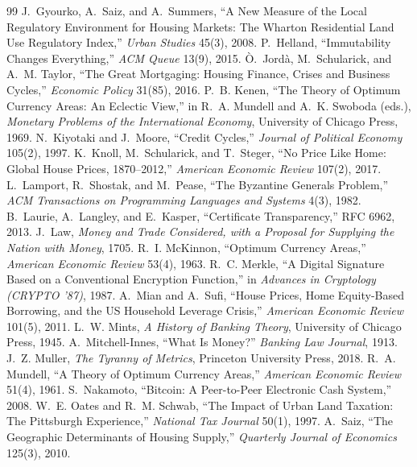 \documentclass[11pt]{article}
\theoremstyle{definition}
\begin{document}
\begin{thebibliography}{99}
 J.~Gyourko, A.~Saiz, and A.~Summers, ``A New Measure of the Local Regulatory Environment for Housing Markets: The Wharton Residential Land Use Regulatory Index,'' \emph{Urban Studies} 45(3), 2008.
 P.~Helland, ``Immutability Changes Everything,'' \emph{ACM Queue} 13(9), 2015.
 \`O.~Jord\`a, M.~Schularick, and A.~M. Taylor, ``The Great Mortgaging: Housing Finance, Crises and Business Cycles,'' \emph{Economic Policy} 31(85), 2016.
 P.~B. Kenen, ``The Theory of Optimum Currency Areas: An Eclectic View,'' in R.~A. Mundell and A.~K. Swoboda (eds.), \emph{Monetary Problems of the International Economy}, University of Chicago Press, 1969.
 N.~Kiyotaki and J.~Moore, ``Credit Cycles,'' \emph{Journal of Political Economy} 105(2), 1997.
 K.~Knoll, M.~Schularick, and T.~Steger, ``No Price Like Home: Global House Prices, 1870--2012,'' \emph{American Economic Review} 107(2), 2017.
 L.~Lamport, R.~Shostak, and M.~Pease, ``The Byzantine Generals Problem,'' \emph{ACM Transactions on Programming Languages and Systems} 4(3), 1982.
 B.~Laurie, A.~Langley, and E.~Kasper, ``Certificate Transparency,'' RFC 6962, 2013.
 J.~Law, \emph{Money and Trade Considered, with a Proposal for Supplying the Nation with Money}, 1705.
 R.~I. McKinnon, ``Optimum Currency Areas,'' \emph{American Economic Review} 53(4), 1963.
 R.~C. Merkle, ``A Digital Signature Based on a Conventional Encryption Function,'' in \emph{Advances in Cryptology (CRYPTO '87)}, 1987.
 A.~Mian and A.~Sufi, ``House Prices, Home Equity-Based Borrowing, and the US Household Leverage Crisis,'' \emph{American Economic Review} 101(5), 2011.
 L.~W. Mints, \emph{A History of Banking Theory}, University of Chicago Press, 1945.
 A.~Mitchell-Innes, ``What Is Money?'' \emph{Banking Law Journal}, 1913.
 J.~Z. Muller, \emph{The Tyranny of Metrics}, Princeton University Press, 2018.
 R.~A. Mundell, ``A Theory of Optimum Currency Areas,'' \emph{American Economic Review} 51(4), 1961.
 S.~Nakamoto, ``Bitcoin: A Peer-to-Peer Electronic Cash System,'' 2008.
 W.~E. Oates and R.~M. Schwab, ``The Impact of Urban Land Taxation: The Pittsburgh Experience,'' \emph{National Tax Journal} 50(1), 1997.
 A.~Saiz, ``The Geographic Determinants of Housing Supply,'' \emph{Quarterly Journal of Economics} 125(3), 2010.

\end{thebibliography}
\end{document}
